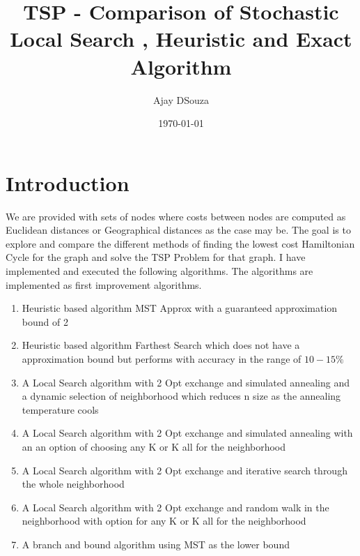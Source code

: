 \documentclass[twoside,11pt]{article}
\title{TSP - Comparison of Stochastic Local Search , Heuristic and Exact Algorithm}
\author{Ajay DSouza}
\date{\today}
\begin{document}
\maketitle


\pagebreak
\tableofcontents

\pagebreak
\listoffigures

\pagebreak
\listoftables

\pagebreak

%
%
\section{Introduction}
\label{introduction}
We are provided with sets of nodes where costs between nodes are computed as Euclidean distances or Geographical distances as the case may be. The goal is to explore and compare the different methods of finding the lowest cost Hamiltonian Cycle for the graph and solve the TSP Problem for that graph. I have implemented and executed the following algorithms. The algorithms are implemented as first improvement algorithms.
\begin{enumerate}
\item
Heuristic based algorithm  MST Approx with a guaranteed approximation bound of 2
\item
Heuristic based algorithm Farthest Search which does not have a approximation bound but performs with accuracy in the range of $10-15\%$
\item
A Local Search algorithm with 2 Opt exchange and simulated annealing and a dynamic selection of neighborhood which reduces n size  as the annealing temperature cools
\item
A Local Search algorithm with 2 Opt exchange and simulated annealing with an an option of choosing any K or K all for the neighborhood
\item
A Local Search algorithm with 2 Opt exchange and iterative search through the whole neighborhood
\item
A Local Search algorithm with 2 Opt exchange and random walk in the neighborhood with option for any K or K all for the neighborhood
\item
A branch and bound algorithm using MST as the lower bound
\end{enumerate} 
\end{document}
